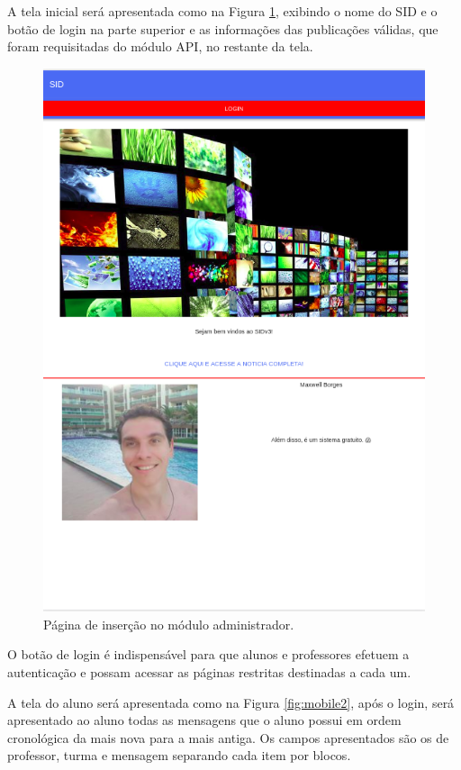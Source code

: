 A tela inicial será apresentada como na Figura \ref{fig:mobile1}, exibindo o nome do SID e o botão de login na parte superior e as informações das publicações válidas, que foram requisitadas do módulo API, no restante da tela.
\begin{figure}[H]
\centering
\includegraphics[scale=0.5]{figuras/mobile1}
\caption{Página de inserção no módulo administrador.}
\label{fig:mobile1}
\end{figure}

O botão de login é indispensável para que alunos e professores efetuem a autenticação e possam acessar as páginas restritas destinadas a cada um.

A tela do aluno será apresentada como na Figura \ref{fig:mobile2}, após o login, será apresentado ao aluno todas as mensagens que o aluno possui em ordem cronológica da mais nova para a mais antiga. Os campos apresentados são os de professor, turma e mensagem separando cada item por blocos.

